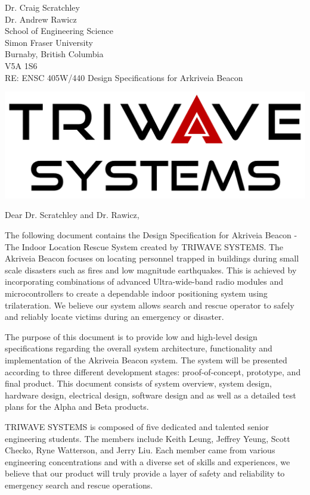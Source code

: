 \documentclass[11pt]{letter}
\date{July 7, 2019}
\begin{document}
\begin{letter}{
Dr. Craig Scratchley\\
Dr. Andrew Rawicz\\
School of Engineering Science\\
Simon Fraser University\\
Burnaby, British Columbia\\
V5A 1S6\\
\bigskip
RE: ENSC 405W/440 Design Specifications for Arkriveia Beacon\\
} 


\begin{center}
\includegraphics[scale=0.25]{./images/logo_W.png}
\end{center}

\opening{Dear Dr. Scratchley and Dr. Rawicz,} 

\medskip
The following document contains the Design Specification for Akriveia Beacon - The Indoor Location Rescue System created by TRIWAVE SYSTEMS. The Akriveia Beacon focuses on locating personnel trapped in buildings during small scale disasters such as fires and low magnitude earthquakes. This is achieved by incorporating combinations of advanced Ultra-wide-band radio modules and microcontrollers to create a dependable indoor positioning system using trilateration. We believe our system allows search and rescue operator to safely and reliably locate victims during an emergency or disaster.

\medskip
The purpose of this document is to provide low and high-level design specifications regarding the overall system architecture, functionality and implementation of the Akriveia Beacon system. The system will be presented according to three different development stages: proof-of-concept, prototype, and final product. This document consists of system overview, system design, hardware design, electrical design, software design and as well as a detailed test plans for the Alpha and Beta products.

\medskip
TRIWAVE SYSTEMS is composed of five dedicated and talented senior engineering students. The members include Keith Leung, Jeffrey Yeung, Scott Checko, Ryne Watterson, and Jerry Liu. Each member came from various engineering concentrations and with a diverse set of skills and experiences, we believe that our product will truly provide a layer of safety and reliability to emergency search and rescue operations.


\end{letter}
\end{document}
